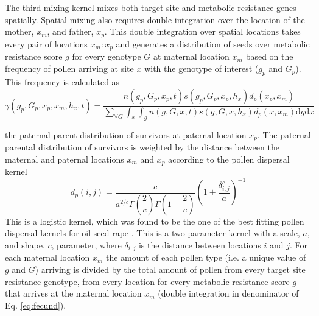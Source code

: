 \documentclass[10pt,letterpaper]{article}
\begin{document}
The third mixing kernel mixes both target site and metabolic resistance genes spatially. Spatial mixing also requires double integration over the location of the mother, $x_m$, and father, $x_p$. This double integration over spatial locations takes every pair of locations $x_m:x_p$ and generates a distribution of seeds over metabolic resistance score $g$ for every genotype $G$ at maternal location $x_m$ based on the frequency of pollen arriving at site $x$ with the genotype of interest ($g_p$ and $G_p$). This frequency is calculated as
\begin{equation}\label{eq:pollen_func}
\gamma(g_p, G_p, x_p, x_m, h_x, t) = \frac{n(g_p, G_p, x_p, t)
s(g_p, G_p, x_p, h_x) d_p(x_p, x_m)} {\sum_{\forall G}\int_{x}\int_{g} n(g, G, x, t) s(g, G, x, h_x) d_p(x, x_m) \text{d}g\text{d}x} 
\end{equation}

 the paternal parent distribution of survivors at paternal location $x_p$. The paternal parental distribution of survivors is weighted by the distance between the maternal and paternal locations $x_m$ and $x_p$ according to the pollen dispersal kernel 
\begin{equation}\label{eq:pollen_disp}
	d_p(i, j) = \frac{c}{a^{2/c}\Gamma\left(\dfrac{2}{c} \right)\Gamma\left(1 - \dfrac{2}{c} \right)}\left( 1 + \dfrac{\delta_{i,j}^c}{a} \right)^{-1} 
\end{equation} 
This is a logistic kernel, which was found to be the one of the best fitting pollen dispersal kernels for oil seed rape \cite{Klei2006}. This is a two parameter kernel with a scale, $a$, and shape, $c$, parameter, where $\delta_{i,j}$ is the distance between locations $i$ and $j$. For each maternal location $x_m$ the amount of each pollen type (i.e. a unique value of $g$ and $G$) arriving is divided by the total amount of pollen from every target site resistance genotype, from every location for every metabolic resistance score $g$ that arrives at the maternal location $x_m$ (double integration in denominator of Eq. \ref{eq:fecund}). 
\end{document}
